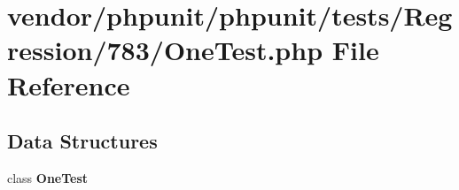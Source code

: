 \section{vendor/phpunit/phpunit/tests/\+Regression/783/\+One\+Test.php File Reference}
\label{_one_test_8php}
\subsection*{Data Structures}
\begin{DoxyCompactItemize}
\item 
class {\bf One\+Test}
\end{DoxyCompactItemize}
